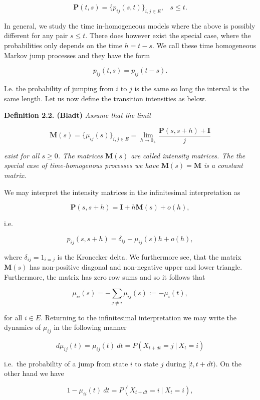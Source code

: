 \documentclass[
]{book}
\begin{document}
\[
\mathbf{P}(t,s)=\big\{p_{ij}(s,t)\big\}_{i,j\in E},\hspace{10pt} s\le t.
\]

In general, we study the time in-homogeneous models where the above is possibly different for any pair \(s\le t\). There does however exist the special case, where the probabilities only depends on the time \(h=t-s\). We call these time homogeneous Markov jump processes and they have the form

\[
p_{ij}(t,s)=p_{ij}(t-s).
\]

I.e. the probability of jumping from \(i\) to \(j\) is the same so long the interval is the same length. Let us now define the transition intensities as below.

\textbf{Definition 2.2. (Bladt)} \emph{Assume that the limit}

\[
\mathbf{M}(s)=\big\{\mu_{ij}(s)\big\}_{i,j\in E}=\lim_{h\to 0_+}\frac{\mathbf{P}(s,s+h)+\mathbf{I}}{j}
\]

\emph{exist for all \(s\ge 0\). The matrices \(\mathbf{M}(s)\) are called intensity matrices. The the special case of time-homogenous processes we have \(\mathbf{M}(s)=\mathbf{M}\) is a constant matrix. }

We may interpret the intensity matrices in the infinitesimal interpretation as

\[
\mathbf{P}(s,s+h) = \mathbf{I}+h\mathbf{M}(s)+o(h),
\]

i.e.

\[
p_{ij}(s,s+h)=\delta_{ij}+\mu_{ij}(s)h+o(h),
\]

where \(\delta_{ij}=1_{i=j}\) is the Kronecker delta. We furthermore see, that the matrix \(\mathbf{M}(s)\) has non-positive diagonal and non-negative upper and lower triangle. Furthermore, the matrix has zero row sums and so it follows that

\[
\mu_{ii}(s)=-\sum_{j\ne i}\mu_{ij}(s):=-\mu_{i}(t),
\]

for all \(i\in E\). Returning to the infinitesimal interpretation we may write the dynamics of \(\mu_{ij}\) in the following manner

\[
d\mu_{ij}(t)=\mu_{ij}(t)\ dt=P(X_{t+dt}=j\ \vert\ X_t=i)
\]

i.e.~the probability of a jump from state \(i\) to state \(j\) during \([t,t+dt)\). On the other hand we have

\[
1-\mu_{ii}(t)\ dt=P(X_{t+dt}=i\ \vert\ X_t=i),
\]
\end{document}
